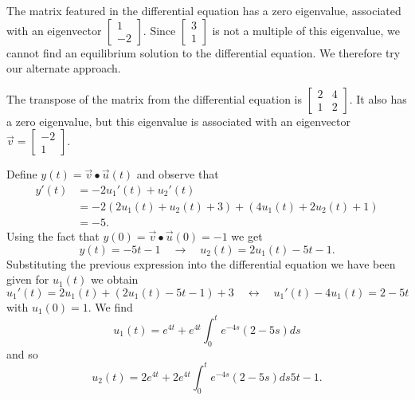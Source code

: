 \documentclass[../book.tex]{subfiles}
\begin{document}
\begin{solution}
The matrix featured in the differential equation has a zero eigenvalue, associated with an eigenvector \(\begin{bmatrix} 1 \\ -2 \end{bmatrix}\). Since \(\begin{bmatrix} 3 \\ 1 \end{bmatrix}\) is not a multiple of this eigenvalue, we cannot find an equilibrium solution to the differential equation. We therefore try our alternate approach.

The transpose of the matrix from the differential equation is \(\begin{bmatrix} 2 & 4 \\ 1 & 2 \end{bmatrix}\). It also has a zero eigenvalue, but this eigenvalue is associated with an eigenvector \(\vec{v} = \begin{bmatrix} -2 \\ 1 \end{bmatrix}\).

Define \(y(t) = \vec{v} \bullet \vec{u}(t)\) and observe that
\begin{equation}\label{eq:sys-55}
\begin{aligned}
  y'(t) 
  &= -2  u_1'(t) + u_2'(t) \\
  &= -2(2 u_1(t) + u_2(t) +3) +(4u_1(t) + 2 u_2(t) + 1) \\
  &= - 5 .
\end{aligned}
\end{equation}
Using the fact that \(y(0) = \vec{v} \bullet\vec{u}(0) = -1\) we get
\begin{equation}\label{eq:sys-56}
y(t) = - 5 t - 1
\quad\longrightarrow\quad
u_2(t) = 2 u_1(t) - 5 t - 1.
\end{equation}
Substituting the previous expression into the differential equation we have been given for \(u_1(t)\) we obtain
\begin{equation}\label{eq:sys-57}
u_1'(t) = 2 u_1(t) + (2 u_1(t) - 5 t - 1) + 3
\quad\longleftrightarrow\quad
u_1'(t) - 4 u_1(t) = 2 - 5 t
\end{equation}
with \(u_1(0)=1\). We find
\begin{equation}\label{eq:sys-58}
u_1(t) = e^{4 t} + e^{4 t}  \int_{0}^{t} e^{-4 s} (2-5 s) ds
\end{equation}
and so
\begin{equation}\label{eq:sys-59}
u_2(t) = 2 e^{4 t} + 2 e^{4 t} \int_0^t e^{-4 s} (2-5 s) ds 5t -1.
\end{equation}
\end{solution}
\end{document}

